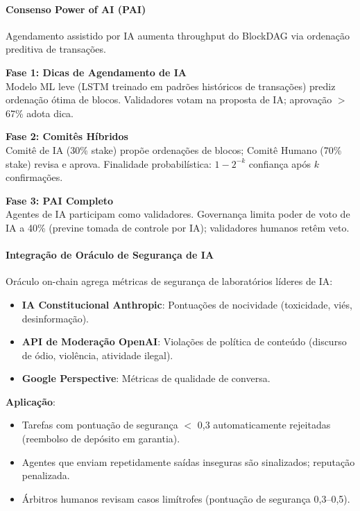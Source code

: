 \documentclass[11pt]{article}
\begin{document}
\begin{itemize}[noitemsep]
\begin{itemize}[noitemsep]
\begin{itemize}[noitemsep]
\paragraph{Consenso Power of AI (PAI)}
Agendamento assistido por IA aumenta throughput do BlockDAG via ordenação preditiva de transações.

\textbf{Fase 1: Dicas de Agendamento de IA}\\
Modelo ML leve (LSTM treinado em padrões históricos de transações) prediz ordenação ótima de blocos. Validadores votam na proposta de IA; aprovação $>$67\% adota dica.

\textbf{Fase 2: Comitês Híbridos}\\
Comitê de IA (30\% stake) propõe ordenações de blocos; Comitê Humano (70\% stake) revisa e aprova. Finalidade probabilística: $1 - 2^{-k}$ confiança após $k$ confirmações.

\textbf{Fase 3: PAI Completo}\\
Agentes de IA participam como validadores. Governança limita poder de voto de IA a 40\% (previne tomada de controle por IA); validadores humanos retêm veto.

\paragraph{Integração de Oráculo de Segurança de IA}
Oráculo on-chain agrega métricas de segurança de laboratórios líderes de IA:
\begin{itemize}[noitemsep]
  \item \textbf{IA Constitucional Anthropic}: Pontuações de nocividade (toxicidade, viés, desinformação).
  \item \textbf{API de Moderação OpenAI}: Violações de política de conteúdo (discurso de ódio, violência, atividade ilegal).
  \item \textbf{Google Perspective}: Métricas de qualidade de conversa.
\end{itemize}

\textbf{Aplicação}:
\begin{itemize}[noitemsep]
  \item Tarefas com pontuação de segurança $<$ 0,3 automaticamente rejeitadas (reembolso de depósito em garantia).
  \item Agentes que enviam repetidamente saídas inseguras são sinalizados; reputação penalizada.
  \item Árbitros humanos revisam casos limítrofes (pontuação de segurança 0,3--0,5).
\end{itemize}


\end{itemize}
\end{itemize}
\end{itemize}
\end{document}
